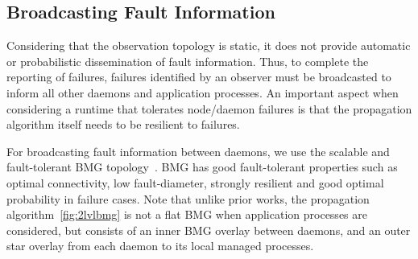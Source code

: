 \documentclass[sigconf]{acmart}
\begin{document}

\subsection{Broadcasting Fault Information}
Considering that the observation topology is static, it does not provide
automatic or probabilistic dissemination of fault information. Thus, to complete
the reporting of failures, failures identified by an observer must be broadcasted
to inform all other daemons and application processes. An important aspect
when considering a runtime that tolerates node/daemon failures is that the
propagation algorithm itself needs to be resilient to failures.

For broadcasting fault information between daemons, we use the scalable and fault-tolerant BMG topology~\cite{Angskun07}. BMG has good fault-tolerant properties such
as optimal connectivity, low fault-diameter, strongly resilient and good optimal
probability in failure cases. Note that unlike prior works, the propagation
algorithm~\ref{fig:2lvlbmg} is not a flat BMG when application processes are considered, but consists of an
inner BMG overlay between daemons, and an outer star overlay from each daemon to its
local managed processes.
\end{document}
